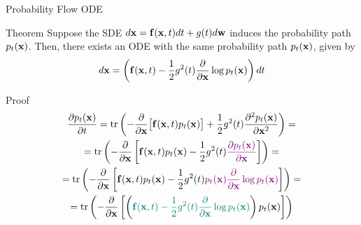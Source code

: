 \documentclass{beamer}
\begin{document}
\begin{frame}{Probability Flow ODE}
	\begin{block}{Theorem}
		Suppose the SDE $d\mathbf{x} = \mathbf{f}(\mathbf{x}, t) dt + g(t) d \mathbf{w}$ induces the probability path $p_t(\mathbf{x})$.
		Then, there exists an ODE with the same probability path $p_t(\mathbf{x})$, given by
		\vspace{-0.3cm}
		\[
			d\mathbf{x} = \left(\mathbf{f}(\mathbf{x}, t) -\frac{1}{2} g^2(t) \frac{\partial}{\partial \mathbf{x}} \log p_t(\mathbf{x}) \right) dt
		\]
		\vspace{-0.7cm}
	\end{block}
	\begin{block}{Proof}
 		\vspace{-0.7cm}
 		{\small
 		\begin{multline*}
 			\frac{\partial p_t(\mathbf{x})}{\partial t} = \text{tr}\left( - \frac{\partial}{\partial \mathbf{x}} \bigl[ \mathbf{f}(\mathbf{x}, t) p_t(\mathbf{x})\bigr] + \frac{1}{2} g^2(t) \frac{\partial^2 p_t(\mathbf{x})}{\partial \mathbf{x}^2} \right) = \\
 			=  \text{tr}\left( - \frac{\partial}{\partial \mathbf{x}} \left[ \mathbf{f}(\mathbf{x}, t) p_t(\mathbf{x}) - \frac{1}{2} g^2(t) {\color{violet}\frac{\partial p_t(\mathbf{x})}{\partial \mathbf{x}}} \right]  \right) = \\
			 =  \text{tr}\left( - \frac{\partial}{\partial \mathbf{x}} \left[ \mathbf{f}(\mathbf{x}, t) p_t(\mathbf{x}) - \frac{1}{2} g^2(t) {\color{violet}p_t(\mathbf{x}) \frac{\partial}{\partial \mathbf{x}} \log p_t(\mathbf{x})} \right]  \right)= \\
		  =  \text{tr}\left( - \frac{\partial}{\partial \mathbf{x}} \left[ \left( {\color{teal}\mathbf{f}(\mathbf{x}, t) - \frac{1}{2} g^2(t) \frac{\partial}{\partial \mathbf{x}} \log p_t(\mathbf{x})}\right) p_t(\mathbf{x}) \right]  \right)
 		\end{multline*}
 		}
 	\end{block}
\end{frame}
\end{document}
